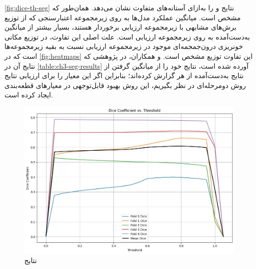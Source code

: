  \autoref{fig:dice-th-seg}
 نتایج 
  و 
 را به‌ازای آستانه‌های متفاوت نشان می‌دهد. همان‌طور که مشخص است. میانگین عملکرد مدل‌ها به روی زیرمجموعه اعتبارسنجی که از توزیع برش‌های مشابهی با زیرمجموعه ارزیابی برخوردار هستند، بسیار بیشتر از میانگین به‌دست‌آمده به روی زیرمجموعه ارزیابی است. علت اصلی این تفاوت، در توزیع مکانی خونریزی درون‌جمجمه‌ای موجود در زیرمجموعه ارزیابی نسبت به بقیه زیر‌مجموعه‌ها است که در 
 \autoref{fig:heatmaps}
 این تفاوت توزیع مشخص است. 
 \cite{hssayeni2020intracranial} 
 و همکاران، در پژوهشی که نتایج آن در
 \autoref{table:ch3-seg-results}
 آورده شده است، نتایج خود را از میانگین گرفتن از نتایج به‌دست‌آمده از هر
 گزارش کرده‌اند؛ بنابراین اگر این معیار را برای ارزیابی نتایج روش دومرحله‌ای در نظر بگیریم، این روش بهبود قابل‌توجهی در معیارهای قطعه‌بندی ایجاد کرده است.
 
 
\begin{figure}[h]
\centering
\includegraphics[width=1.0\linewidth]{Images/Chapter3/dice-th-seg}
\caption{نتایج}
\label{fig:dice-th-seg}
\end{figure}
 
 
 